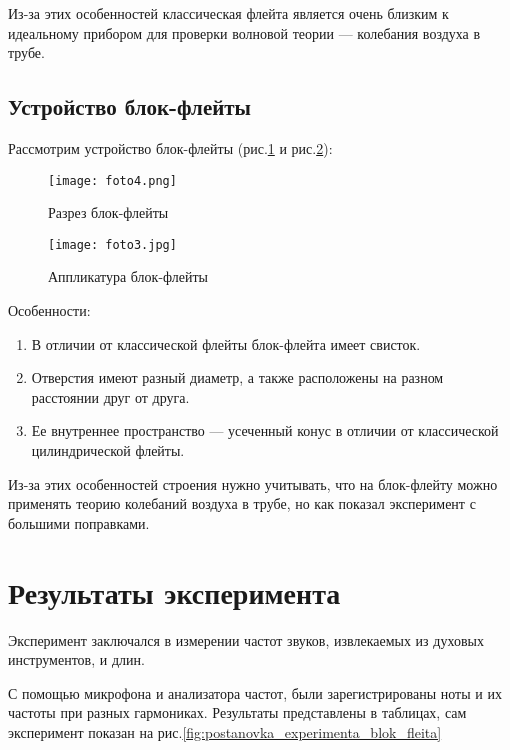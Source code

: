 Из-за этих особенностей классическая флейта является очень близким к идеальному прибором для проверки волновой теории --- колебания воздуха в трубе.

\subsection{Устройство блок-флейты}

Рассмотрим устройство блок-флейты (рис.\ref{fig:razrez_blok_fleity} и рис.\ref{fig:applikatura_blok_fleity}):
\begin{figure}[!ht]
    \centering
    \texttt{[image: foto4.png]}
    \caption{Разрез блок-флейты}
    \label{fig:razrez_blok_fleity}
\end{figure}

\begin{figure}[!ht]
    \centering
    \texttt{[image: foto3.jpg]}
    \caption{Аппликатура блок-флейты}
    \label{fig:applikatura_blok_fleity}
\end{figure}

Особенности:
\begin{enumerate}
    \item В отличии от классической флейты блок-флейта имеет свисток.
    \item Отверстия имеют разный диаметр, а также расположены на разном расстоянии друг от друга.
    \item Ее внутреннее пространство --- усеченный конус в отличии от классической цилиндрической флейты.
\end{enumerate}

Из-за этих особенностей строения нужно учитывать, что на блок-флейту можно применять теорию колебаний воздуха 
в трубе, но как показал эксперимент с большими поправками. 


\newpage

\section{Результаты эксперимента}

Эксперимент заключался в измерении частот звуков, извлекаемых из духовых инструментов, и длин.

С помощью микрофона и анализатора частот, были зарегистрированы ноты и их частоты при разных гармониках.
Результаты представлены в таблицах, сам эксперимент показан на рис.\ref{fig:postanovka_experimenta_blok_fleita}

